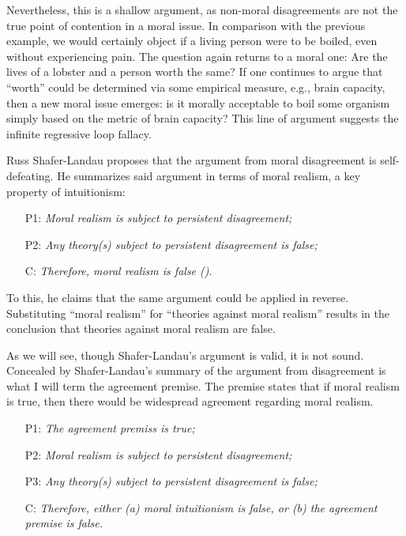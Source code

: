 \documentclass[12pt, a4paper, twoside]{article}
\begin{document}
Nevertheless, this is a shallow argument, as non-moral disagreements are not the true point of contention in a moral issue. In comparison with the previous example, we would certainly object if a living person were to be boiled, even without experiencing pain. The question again returns to a moral one: Are the lives of a lobster and a person worth the same? If one continues to argue that “worth” could be determined via some empirical measure, e.g., brain capacity, then a new moral issue emerges: is it morally acceptable to boil some organism simply based on the metric of brain capacity? This line of argument suggests the infinite regressive loop fallacy.  

Russ Shafer-Landau proposes that the argument from moral disagreement is self-defeating. He summarizes said argument in terms of moral realism, a key property of intuitionism: 
\begin{enumerate}
	\item[P1:] \textit{Moral realism is subject to persistent disagreement;}

	\item[P2:] \textit{Any theory(s) subject to persistent disagreement is false;}

	\item[C:] \textit{Therefore, moral realism is false (\cite[pp.\ 44–48]{shaferlandau2004good})}.
\end{enumerate}

To this, he claims that the same argument could be applied in reverse. Substituting “moral realism” for “theories against moral realism” results in the conclusion that theories against moral realism are false. 

As we will see, though Shafer-Landau’s argument is valid, it is not sound. Concealed by Shafer-Landau’s summary of the argument from disagreement is what I will term the agreement premise. The premise states that if moral realism is true, then there would be widespread agreement regarding moral realism. 

\begin{enumerate}

	\item[P1:] \textit{The agreement premiss is true;}

	\item[P2:] \textit{Moral realism is subject to persistent disagreement;}

	\item[P3:] \textit{Any theory(s) subject to persistent disagreement is false;}

	\item[C:] \textit{Therefore, either (a) moral intuitionism is false, or (b) the agreement premise is false.}

\end{enumerate}
\end{document}
